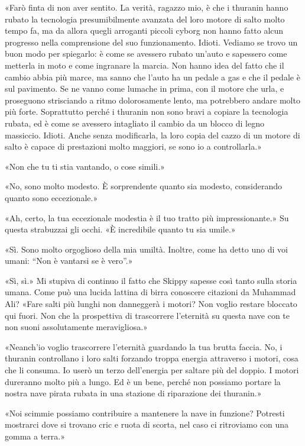 «Farò finta di non aver sentito. La verità, ragazzo mio, è che i
thuranin hanno rubato la tecnologia presumibilmente avanzata del loro
motore di salto molto tempo fa, ma da allora quegli arroganti piccoli
cyborg non hanno fatto alcun progresso nella comprensione del suo
funzionamento. Idioti. Vediamo se trovo un buon modo per spiegarlo: è
come se avessero rubato un'auto e sapessero come metterla in moto e come
ingranare la marcia. Non hanno idea del fatto che il cambio abbia più
marce, ma sanno che l'auto ha un pedale a gas e che il pedale è sul
pavimento. Se ne vanno come lumache in prima, con il motore che urla, e
proseguono strisciando a ritmo dolorosamente lento, ma potrebbero andare
molto più forte. Soprattutto perché i thuranin non sono bravi a copiare
la tecnologia rubata, ed è come se avessero intagliato il cambio da un
blocco di legno massiccio. Idioti. Anche senza modificarla, la loro
copia del cazzo di un motore di salto è capace di prestazioni molto
maggiori, se sono io a controllarla.»

«Non che tu ti stia vantando, o cose simili.»

«No, sono molto modesto. È sorprendente quanto sia modesto, considerando
quanto sono eccezionale.»

«Ah, certo, la tua eccezionale modestia è il tuo tratto più
impressionante.» Su questa strabuzzai gli occhi. «È incredibile quanto
tu sia umile.»

«Sì. Sono molto orgoglioso della mia umiltà. Inoltre, come ha detto uno
di voi umani: ``Non è vantarsi se è vero''.»

«Sì, sì.» Mi stupiva di continuo il fatto che Skippy sapesse così tanto
sulla storia umana. Come può una lucida lattina di birra conoscere
citazioni da Muhammad Ali? «Fare salti più lunghi non danneggerà i
motori? Non voglio restare bloccato qui fuori. Non che la prospettiva di
trascorrere l'eternità su questa nave con te non suoni assolutamente
meravigliosa.»

«Neanch'io voglio trascorrere l'eternità guardando la tua brutta faccia.
No, i thuranin controllano i loro salti forzando troppa energia
attraverso i motori, cosa che li consuma. Io userò un terzo dell'energia
per saltare più del doppio. I motori dureranno molto più a lungo. Ed è
un bene, perché non possiamo portare la nostra nave pirata rubata in una
stazione di riparazione dei thuranin.»

«Noi scimmie possiamo contribuire a mantenere la nave in funzione?
Potresti mostrarci dove si trovano cric e ruota di scorta, nel caso ci
ritroviamo con una gomma a terra.»

